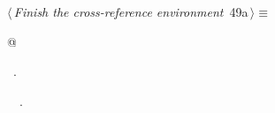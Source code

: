 \documentclass[a4paper]{report}
\begin{document}
\begin{flushleft} \small
\begin{minipage}{\linewidth}\label{scrap93}\raggedright\small
{} $\langle\,${\it Finish the cross-reference environment}\nobreak\ {\footnotesize {49a}}$\,\rangle\equiv$
\vspace{-1ex}
\begin{list}{}{} \item
\mbox{}@{\NWsep}
\end{list}
\vspace{-1.5ex}
\footnotesize
\begin{list}{}{\setlength{\itemsep}{-\parsep}\setlength{\itemindent}{-\leftmargin}}
\item \NWtxtMacroRefIn\ .
\item \NWtxtIdentsUsed\nobreak\  \verb@fputs@\nobreak\ .
\item{}
\end{list}
\end{minipage}\vspace{4ex}
\end{flushleft}
\end{document}
